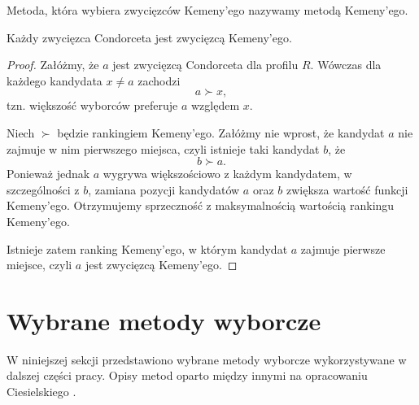 \documentclass[12pt,a4paper]{mwrep}
\begin{document}
	Metoda, która wybiera zwycięzców Kemeny'ego nazywamy metodą Kemeny'ego.

	\begin{wniosek}
		Każdy zwycięzca Condorceta jest zwycięzcą Kemeny’ego.
	\end{wniosek}
	
	\begin{proof}
		Załóżmy, że \(a\) jest zwycięzcą Condorceta dla profilu \(R\). Wówczas dla każdego kandydata \(x \neq a\) zachodzi
		\[
		a \succ x,
		\]
		tzn. większość wyborców preferuje \(a\) względem \(x\).
		
		Niech \(\succ\) będzie rankingiem Kemeny’ego. Załóżmy nie wprost, że kandydat \(a\) nie zajmuje w nim pierwszego miejsca, czyli istnieje taki kandydat \(b\), że
		\[
		b \succ a.
		\]
		Ponieważ jednak \(a\) wygrywa większościowo z każdym kandydatem, w szczególności z \(b\), zamiana pozycji kandydatów \(a\) oraz \(b\) zwiększa wartość funkcji Kemeny’ego. Otrzymujemy sprzeczność z maksymalnością wartością rankingu Kemeny'ego.
		
		Istnieje zatem ranking Kemeny’ego, w którym kandydat \(a\) zajmuje pierwsze miejsce, czyli \(a\) jest zwycięzcą Kemeny’ego.
	\end{proof}

	\section{Wybrane metody wyborcze}
	
	W niniejszej sekcji przedstawiono wybrane metody wyborcze wykorzystywane w dalszej części pracy. Opisy metod oparto między innymi na opracowaniu Ciesielskiego \cite{ciesielski2020wybory}.
	
\end{document}
